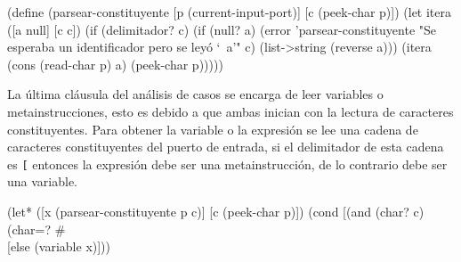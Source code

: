 \documentclass[letterpaper,twoside,openright,10pt]{book}
\begin{document}
\nwenddocs{}\plusendmoddef
(define (parsear-constituyente [p (current-input-port)]
                               [c (peek-char p)])
  (let itera ([a null]
              [c c])
    (if (delimitador? c)
        (if (null? a)
            (error 'parsear-constituyente "Se esperaba un identificador pero se leyó `~a'" c)
            (list->string (reverse a)))
        (itera (cons (read-char p) a)
               (peek-char p)))))

\eatline
{}\nwendcode{}\nwdocspar

La última cláusula del análisis de casos se encarga de leer variables o metainstrucciones, esto es debido a que ambas inician con la lectura de caracteres constituyentes. Para obtener la variable o la expresión se lee una cadena de caracteres constituyentes del puerto de entrada, si el delimitador de esta cadena es {\tt{}{}{}[} entonces la expresión debe ser una metainstrucción, de lo contrario debe ser una variable.

\nwenddocs{}\endmoddef
(let* ([x (parsear-constituyente p c)]
       [c (peek-char p)])
  (cond [(and (char? c) (char=? #\\[ c))
         (read-char p)
         (metainstrucción x (parsear-corchetes p))]
        [else
         (variable x)]))
\nwendcode{}\nwdocspar
\end{document}
